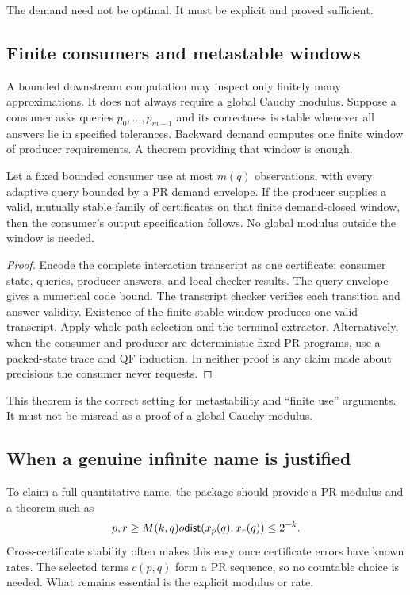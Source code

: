 The demand need not be optimal.  It must be explicit and proved sufficient.

\subsection{Finite consumers and metastable windows}

A bounded downstream computation may inspect only finitely many approximations.
It does not always require a global Cauchy modulus.  Suppose a consumer asks
queries \(p_0,\ldots,p_{m-1}\) and its correctness is stable whenever all
answers lie in specified tolerances.  Backward demand computes one finite
window of producer requirements.  A theorem providing that window is enough.

\begin{theorem}\label{thm:finite-consumer}
Let a fixed bounded consumer use at most \(m(q)\) observations, with every
adaptive query bounded by a PR demand envelope.  If the producer supplies a
valid, mutually stable family of certificates on that finite demand-closed
window, then the consumer's output specification follows.  No global modulus
outside the window is needed.
\end{theorem}

\begin{proof}
Encode the complete interaction transcript as one certificate: consumer state,
queries, producer answers, and local checker results.  The query envelope gives
a numerical code bound.  The transcript checker verifies each transition and
answer validity.  Existence of the finite stable window produces one valid
transcript.  Apply whole-path selection and the terminal extractor.
Alternatively, when the consumer and producer are deterministic fixed PR
programs, use a packed-state trace and QF induction.  In neither proof is any
claim made about precisions the consumer never requests.
\end{proof}

This theorem is the correct setting for metastability and ``finite use''
arguments.  It must not be misread as a proof of a global Cauchy modulus.

\subsection{When a genuine infinite name is justified}

To claim a full quantitative name, the package should provide a PR modulus and
a theorem such as
\[
  p,r\ge M(k,q)	o
  \mathsf{dist}(x_p(q),x_r(q))\le2^{-k}.
\]
Cross-certificate stability often makes this easy once certificate errors have
known rates.  The selected terms \(c(p,q)\) form a PR sequence, so no countable
choice is needed.  What remains essential is the explicit modulus or rate.

